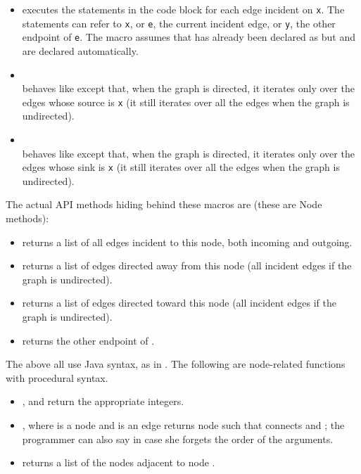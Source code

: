 \begin{itemize}

\item
{}
executes the statements in the code block for each edge incident on \verb$x$.
The statements can refer to \verb$x$, or \verb$e$, the current incident edge,
or \verb$y$, the other endpoint of \verb$e$.
The macro assumes that  has already been declared as 
but  and  are declared automatically.

\item
{}\\
behaves like  except that, when the graph is directed,
it iterates only over the edges whose source is \verb$x$ (it still iterates over all the edges when the graph is undirected). 

\item
{}\\
behaves like  except that, when the graph is directed,
it iterates only over the edges whose sink is \verb$x$ (it still iterates over all the edges when the graph is undirected). 

\end{itemize}

The actual API methods hiding behind these macros are (these are Node methods):

\begin{itemize}
\item
{} returns a list of all edges incident to this node,
both incoming and outgoing.
\item
{} returns a list of edges directed away
from this node (all incident edges if the graph is undirected).
\item
{} returns a list of edges directed toward
this node (all incident edges if the graph is undirected).
\item
{} returns the other endpoint of .
\end{itemize}

The above all use Java syntax, as in .
The following are node-related functions with procedural syntax.

\begin{itemize}
\item {},  and  return the appropriate
integers.
\item {}, where  is a node and  is an edge
returns node  such that  connects  and ;
the programmer can also say  in case she forgets the order
of the arguments.
\item {} returns a list of the nodes adjacent to node .
\end{itemize}

